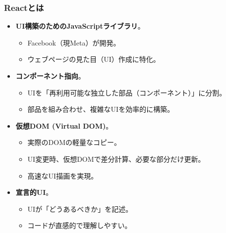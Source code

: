 \documentclass{beamer}
\begin{document}
\begin{frame}
    \frametitle{Reactとは}
    \begin{itemize}
        \item \textbf{UI構築のためのJavaScriptライブラリ}。
            \begin{itemize}
                \item Facebook（現Meta）が開発。
                \item ウェブページの見た目（UI）作成に特化。
            \end{itemize}
        \item \textbf{コンポーネント指向}。
            \begin{itemize}
                \item UIを「再利用可能な独立した部品（コンポーネント）」に分割。
                \item 部品を組み合わせ、複雑なUIを効率的に構築。
            \end{itemize}
        \item \textbf{仮想DOM (Virtual DOM)}。
            \begin{itemize}
                \item 実際のDOMの軽量なコピー。
                \item UI変更時、仮想DOMで差分計算、必要な部分だけ更新。
                \item 高速なUI描画を実現。
            \end{itemize}
        \item \textbf{宣言的UI}。
            \begin{itemize}
                \item UIが「どうあるべきか」を記述。
                \item コードが直感的で理解しやすい。
            \end{itemize}
    \end{itemize}
\end{frame}
\end{document}
